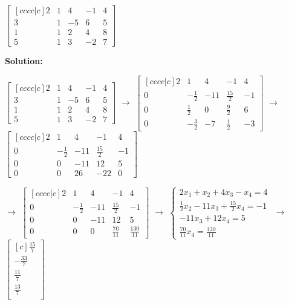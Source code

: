 \begin{outline}[enumerate]
\2  $  \begin{bmatrix} [cccc|c]
2 & 1 & 4 & -1 & 4 \\
3 & 1 & -5 &  6  & 5\\
1 & 1 & 2 &  4 & 8 \\
5 & 1 & 3 &  -2 & 7
  \end{bmatrix} $
  

\bf{Solution:}  
  
$  \begin{bmatrix} [cccc|c]
2 & 1 & 4 & -1 & 4 \\
3 & 1 & -5 &  6  & 5\\
1 & 1 & 2 &  4 & 8 \\
5 & 1 & 3 &  -2 & 7
  \end{bmatrix} $
  $\rightarrow$
$  \begin{bmatrix} [cccc|c]
2 & 1 & 4 & -1 & 4 \\
0 & -\frac{1}{2} & -11 & \frac{15}{2}  & -1\\
0 & \frac{1}{2} & 0 & \frac{9}{2} & 6 \\
0 & -\frac{3}{2} & -7 & \frac{1}{2} & -3
  \end{bmatrix} $
  $\rightarrow$
$  \begin{bmatrix} [cccc|c]
2 & 1 & 4 & -1 & 4 \\
0 & -\frac{1}{2} & -11 & \frac{15}{2} & -1\\
0 & 0 & -11 & 12 & 5 \\
0 & 0 & 26 & -22 & 0
  \end{bmatrix} $
  
  $\rightarrow$
$  \begin{bmatrix} [cccc|c]
2 & 1 & 4 & -1 & 4 \\
0 & -\frac{1}{2} & -11 & \frac{15}{2} & -1\\
0 & 0 & -11 & 12 & 5 \\
0 & 0 & 0 & \frac{70}{11} & \frac{130}{11}
  \end{bmatrix} $
  $\rightarrow$
$ \begin{cases} 2x_1 + x_2 + 4x_3 - x_4 = 4 \\  \frac{1}{2}x_2 - 11x_3 + \frac{15}{2}x_4 = -1 \\ -11x_3 + 12x_4 = 5 \\ \frac{70}{11}x_4 = \frac{130}{11}   \end{cases} $
  $\rightarrow$
  $\begin{bmatrix} [c]
  \frac{15}{7} \\
  -\frac{33}{7} \\
  \frac{11}{7} \\
  \frac{13}{7} \\
  \end{bmatrix} $ 
 
 

	
 

\end{outline}


 

